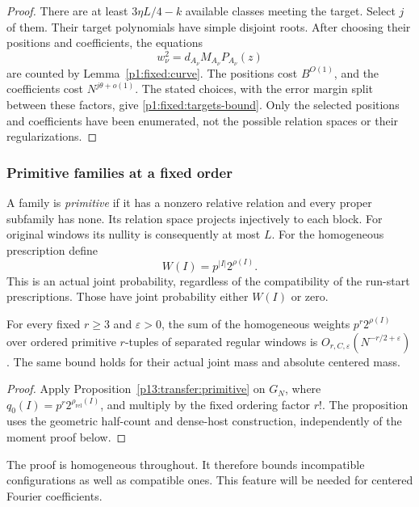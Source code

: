 \begin{proof}
There are at least \(3\eta L/4-k\) available classes
meeting the target. Select \(j\) of them. Their target
polynomials have simple disjoint roots. After choosing
their positions and coefficients, the equations
\[
 w_\nu^2=d_{A_\nu}M_{A_\nu}P_{A_\nu}(z)
\]
are counted by Lemma~\ref{p1:fixed:curve}.
The positions cost \(B^{O(1)}\), and the coefficients cost
\(N^{j\theta+o(1)}\). The stated choices, with the error
margin split between these factors, give
\eqref{p1:fixed:targets-bound}.
Only the selected positions and coefficients have been
enumerated, not the possible relation spaces or their
regularizations.
\end{proof}
\subsubsection{Primitive families at a fixed order}

A family is \emph{primitive} if it has a nonzero relative
relation and every proper subfamily has none. Its relation
space projects injectively to each block. For original
windows its nullity is consequently at most \(L\).
For the homogeneous prescription define
\[
 W(I)=p^{|I|}2^{\rho(I)}.
\]
This is an actual joint probability, regardless of the
compatibility of the run-start prescriptions. Those have
joint probability either \(W(I)\) or zero.

\begin{corollary}
\label{p1:fixed:primitive}
For every fixed $r\ge3$ and $\varepsilon>0$, the sum of the homogeneous
weights $p^r2^{\rho(I)}$ over ordered primitive $r$-tuples of separated
regular windows is $O_{r,C,\varepsilon}(N^{-r/2+\varepsilon})$.
The same bound holds for their actual joint mass and absolute centered mass.
\end{corollary}
\begin{proof}
Apply Proposition~\ref{p13:transfer:primitive} on $G_N$, where
$q_0(I)=p^r2^{\rho_{\mathrm{rel}}(I)}$, and multiply by the fixed
ordering factor $r!$. The proposition uses the geometric half-count and
dense-host construction, independently of the moment proof below.
\end{proof}

The proof is homogeneous throughout. It therefore bounds
incompatible configurations as well as compatible ones.
This feature will be needed for centered Fourier coefficients.

